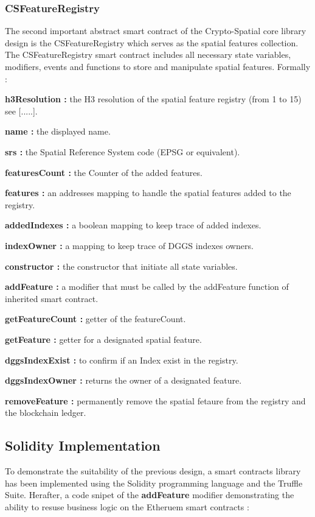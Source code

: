 \documentclass{isprs} %
\begin{document}
\subsubsection{CSFeatureRegistry}\label{sec:CSFeatureRegistry}

The second important abstract smart contract of the Crypto-Spatial core library design is the CSFeatureRegistry which serves as the spatial features collection. 
The CSFeatureRegistry smart contract includes all necessary state variables, modifiers, events and functions to store and manipulate spatial features. Formally :

\textbf{h3Resolution :} the H3 resolution of the spatial feature registry (from 1 to 15) see [.....].

\textbf{name :} the displayed name.

\textbf{srs :} the Spatial Reference System code (EPSG or equivalent).

\textbf{featuresCount :} the Counter of the added features.

\textbf{features :} an addresses mapping to handle the spatial features added to the registry.

\textbf{addedIndexes :} a boolean mapping to keep trace of added indexes.

\textbf{indexOwner :} a mapping to keep trace of DGGS indexes owners.

\textbf{constructor :} the constructor that initiate all state variables.

\textbf{addFeature :} a modifier that must be called by the addFeature function of inherited smart contract.

\textbf{getFeatureCount :} getter of the featureCount.

\textbf{getFeature :} getter for a designated spatial feature.

\textbf{dggsIndexExist :} to confirm if an Index exist in the registry.

\textbf{dggsIndexOwner :} returns the owner of a designated feature.

\textbf{removeFeature :} permanently remove the spatial fetaure from the registry and the blockchain ledger.

\subsection{Solidity Implementation}\label{sec:Solidity Implementation}

To demonstrate the suitability of the previous design, a smart contracts library has been implemented using the Solidity programming language and the Truffle Suite. Herafter, a code snipet of the \textbf{addFeature} modifier demonstrating the ability to resuse business logic on the Etheruem smart contracts :
\end{document}
